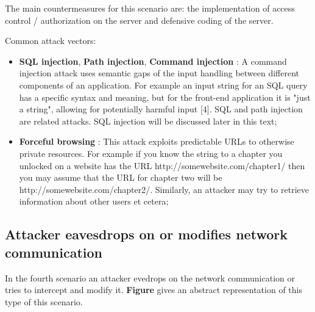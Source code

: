 The main countermeasures for this scenario are: the implementation of access control / authorization on the server and defensive coding of the server.

Common attack vectors:
\begin{itemize}
	\item \textbf{SQL injection}, \textbf{Path injection}, \textbf{Command injection} : A command injection attack uses semantic gaps of the input handling between different components of an application. For example an input string for an SQL query has a specific syntax and meaning, but for the front-end application it is "just a string", allowing for potentially harmful input [4]. SQL and path injection are related attacks. SQL injection will be discussed later in this text;
	\item \textbf{Forceful browsing} : This attack exploits predictable URLs to otherwise private resources. For example if you know the string to a chapter you unlocked on a website has the URL http://somewebsite.com/chapter1/ then you may assume that the URL for chapter two will be http://somewebsite.com/chapter2/. Similarly, an attacker may try to retrieve information about other users et cetera;
\end{itemize}



\subsection{Attacker eavesdrops on or modifies network communication}

In the fourth scenario an attacker evedrops on the network communication or tries to intercept and modify it. \textbf{Figure} gives an abstract representation of this type of this scenario.

